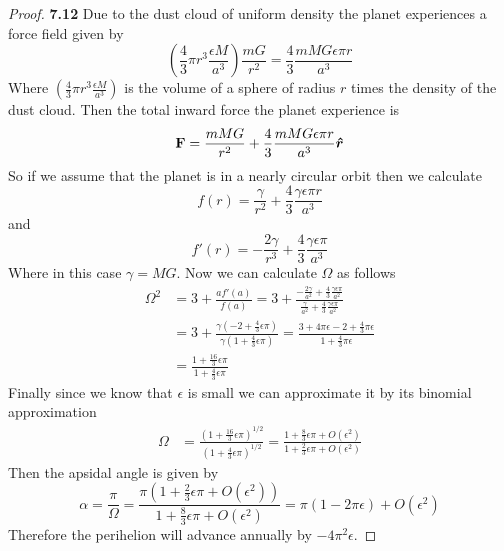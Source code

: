 \documentclass[11pt]{article}
\newcommand{\hatr}{\bm{\hat{r}}}
\theoremstyle{definition}
\begin{document}
	\begin{proof}{\textbf{7.12}}
        Due to the dust cloud of uniform density the planet experiences a force field
        given by
        $$\left(\frac{4}{3}\pi r^3 \frac{\epsilon M}{a^3}\right) \frac{mG}{r^2} =
        \frac{4}{3}\frac{mMG\epsilon\pi r}{a^3}$$
        Where $\left(\frac{4}{3}\pi r^3 \frac{\epsilon M}{a^3}\right)$ is the volume of
        a sphere of radius $r$ times the density of the dust cloud. Then the total
        inward force the planet experience is
        $$\vectorbold{F} = \frac{mMG}{r^2} + \frac{4}{3}\frac{mMG\epsilon\pi r}{a^3} \hatr$$
        So if we assume that the planet is in a nearly circular orbit then we calculate
        $$f(r) = \frac{\gamma}{r^2} + \frac{4}{3}\frac{\gamma\epsilon\pi r}{a^3}$$
        and
        $$f'(r) = -\frac{2\gamma}{r^3} + \frac{4}{3}\frac{\gamma\epsilon\pi }{a^3}$$
        Where in this case $\gamma = MG$. Now we can calculate $\Omega$ as follows
        \begin{align*}
            \Omega^2 &= 3 + \frac{af'(a)}{f(a)}
                = 3 + \frac{-\frac{2\gamma}{a^2} + \frac{4}{3}\frac{\gamma\epsilon\pi }{a^2}}
                {\frac{\gamma}{a^2} + \frac{4}{3}\frac{\gamma\epsilon\pi }{a^2}}\\
                &= 3 + \frac{\gamma(-2 + \frac{4}{3} \epsilon \pi)}
                {\gamma(1 + \frac{4}{3}\epsilon \pi)}
                = \frac{3 + 4\pi\epsilon -2 + \frac{4}{3}\pi\epsilon}{1 + \frac{4}{3}\pi\epsilon}\\
                &= \frac{1 + \frac{16}{3} \epsilon \pi}{1 + \frac{4}{3}\epsilon \pi}
        \end{align*}
        Finally since we know that $\epsilon$ is small we can approximate it by its
        binomial approximation
        \begin{align*}
            \Omega &= \frac{(1 + \frac{16}{3} \epsilon \pi)^{1/2}}
            {(1 + \frac{4}{3}\epsilon \pi)^{1/2}}
            = \frac{1+\frac{8}{3}\epsilon\pi + O(\epsilon^2)}
            {1+\frac{2}{3}\epsilon\pi + O(\epsilon^2)}
        \end{align*}
        Then the apsidal angle is given by
        $$\alpha = \frac{\pi}{\Omega} = \frac{\pi(1+\frac{2}{3}\epsilon\pi + O(\epsilon^2))}
        {1+\frac{8}{3}\epsilon\pi + O(\epsilon^2)} = \pi(1 - 2\pi\epsilon) + O(\epsilon^2)$$
        Therefore the perihelion will advance annually by $-4\pi^2\epsilon$.
    \end{proof}
\cleardoublepage
\end{document}
